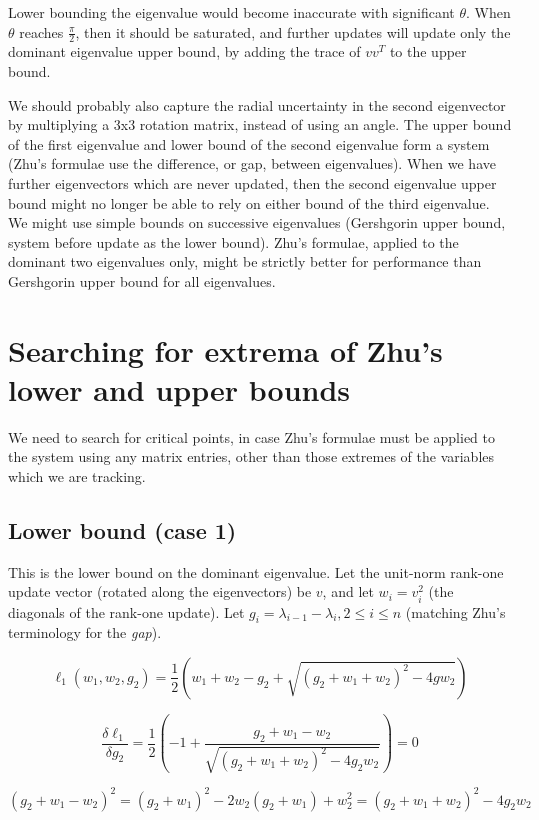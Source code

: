 \documentclass{article}
\begin{document}
Lower bounding the eigenvalue would become inaccurate with significant $\theta$. When $\theta$ reaches $\frac{\pi}{2}$, then it should be saturated, and further updates will update only the dominant eigenvalue upper bound, by adding the trace of $v v^T$ to the upper bound.

We should probably also capture the radial uncertainty in the second eigenvector by multiplying a 3x3 rotation matrix, instead of using an angle. The upper bound of the first eigenvalue and lower bound of the second eigenvalue form a system (Zhu's formulae use the difference, or gap, between eigenvalues). When we have further eigenvectors which are never updated, then the second eigenvalue upper bound might no longer be able to rely on either bound of the third eigenvalue. We might use simple bounds on successive eigenvalues (Gershgorin upper bound, system before update as the lower bound). Zhu's formulae, applied to the dominant two eigenvalues only, might be strictly better for performance than Gershgorin upper bound for all eigenvalues.

\section{Searching for extrema of Zhu's lower and upper bounds}

We need to search for critical points, in case Zhu's formulae must be applied to the system using any matrix entries, other than those extremes of the variables which we are tracking.

\subsection{Lower bound (case 1)}

This is the lower bound on the dominant eigenvalue. Let the unit-norm rank-one update vector (rotated along the eigenvectors) be $v$, and let $w_i = v_i^2$ (the diagonals of the rank-one update). Let $g_i = \lambda_{i-1} - \lambda_i, 2 \le i \le n$ (matching Zhu's terminology for the \textit{gap}).

$$
\ell_1(w_1, w_2, g_2) = \frac{1}{2} \left(w_1 + w_2 - g_2 + \sqrt{(g_2 + w_1 + w_2)^2 - 4g w_2} \right)
$$

$$
\frac{\delta \ell_1}{\delta g_2}
=
\frac{1}{2} \left(
    -1 + \frac{g_2 + w_1 - w_2}{\sqrt{(g_2+w_1+w_2)^2 - 4g_2w_2}}
\right)
= 0
$$

$$
(g_2 + w_1 - w_2)^2 = (g_2 + w_1)^2 - 2w_2(g_2 + w_1) + w_2^2 = (g_2+w_1+w_2)^2 - 4g_2w_2
$$
\end{document}
